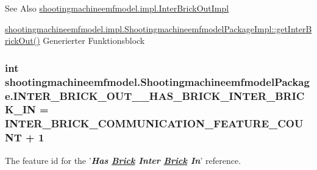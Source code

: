\begin{DoxySeeAlso}{See Also}
\hyperlink{classshootingmachineemfmodel_1_1impl_1_1_inter_brick_out_impl}{shootingmachineemfmodel.\-impl.\-Inter\-Brick\-Out\-Impl} 

\hyperlink{classshootingmachineemfmodel_1_1impl_1_1_shootingmachineemfmodel_package_impl_a8213bce7c3c0e456759def0df96884a9}{shootingmachineemfmodel.\-impl.\-Shootingmachineemfmodel\-Package\-Impl\-::get\-Inter\-Brick\-Out()} Generierter Funktionsblock 
\end{DoxySeeAlso}
\hypertarget{interfaceshootingmachineemfmodel_1_1_shootingmachineemfmodel_package_a1b082b162aee9b1ea89c4c9366027203}{
\subsubsection[{I\-N\-T\-E\-R\-\_\-\-B\-R\-I\-C\-K\-\_\-\-O\-U\-T\-\_\-\-\_\-\-H\-A\-S\-\_\-\-B\-R\-I\-C\-K\-\_\-\-I\-N\-T\-E\-R\-\_\-\-B\-R\-I\-C\-K\-\_\-\-I\-N}]{\setlength{\rightskip}{0pt plus 5cm}int shootingmachineemfmodel.\-Shootingmachineemfmodel\-Package.\-I\-N\-T\-E\-R\-\_\-\-B\-R\-I\-C\-K\-\_\-\-O\-U\-T\-\_\-\-\_\-\-H\-A\-S\-\_\-\-B\-R\-I\-C\-K\-\_\-\-I\-N\-T\-E\-R\-\_\-\-B\-R\-I\-C\-K\-\_\-\-I\-N = {\bf I\-N\-T\-E\-R\-\_\-\-B\-R\-I\-C\-K\-\_\-\-C\-O\-M\-M\-U\-N\-I\-C\-A\-T\-I\-O\-N\-\_\-\-F\-E\-A\-T\-U\-R\-E\-\_\-\-C\-O\-U\-N\-T} + 1}}\label{interfaceshootingmachineemfmodel_1_1_shootingmachineemfmodel_package_a1b082b162aee9b1ea89c4c9366027203}
The feature id for the '{\itshape {\bfseries Has \hyperlink{interfaceshootingmachineemfmodel_1_1_brick}{Brick} Inter \hyperlink{interfaceshootingmachineemfmodel_1_1_brick}{Brick} In}}' reference.

